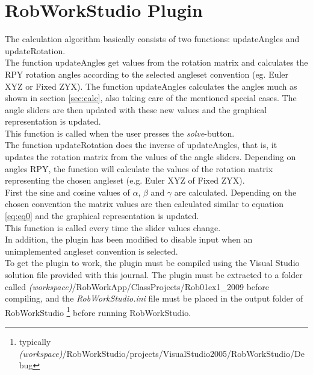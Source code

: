 
\section{RobWorkStudio Plugin}

The calculation algorithm basically consists of two functions: updateAngles and updateRotation.\\

The function updateAngles get values from the rotation matrix and calculates the RPY rotation angles according to the selected angleset convention (eg. Euler XYZ or Fixed ZYX). The function updateAngles calculates the angles much as shown in section \ref{sec:calc}, also taking care of the mentioned special cases. The angle sliders are then updated with these new values and the graphical representation is updated.\\
This function is called when the user presses the \textit{solve}-button.\\

The function updateRotation does the inverse of updateAngles, that is, it updates the rotation matrix from the values of the angle sliders. Depending on angles RPY, the function will calculate the values of the rotation matrix representing the chosen angleset (e.g. Euler XYZ of Fixed ZYX). \\
First the sine and cosine values of $\alpha$, $\beta$ and  $\gamma$ are calculated. Depending on the chosen convention the matrix values are then calculated similar to equation \eqref{eq:eq0} and the graphical representation is updated.\\
This function is called every time the slider values change.\\

In addition, the plugin has been modified to disable input when an unimplemented angleset convention is selected.\\

To get the plugin to work, the plugin must be compiled using the Visual Studio solution file provided with this journal. The plugin must be extracted to a folder called \textit{(workspace)}/RobWorkApp/ClassProjects/Rob01ex1\_2009 before compiling, and the \textit{RobWorkStudio.ini} file must be placed in the output folder of RobWorkStudio \footnote{typically \textit{(workspace)}/RobWorkStudio/projects/VisualStudio2005/RobWorkStudio/Debug} before running RobWorkStudio.

